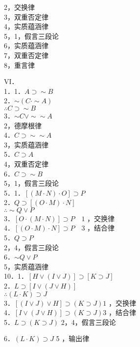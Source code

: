 2，交换律\\
3，双重否定律\\
4，实质蕴涵律\\
5，1，假言三段论\\
6，实质蕴涵律\\
7，双重否定律\\
8，重言律

VI．\\
1．1．$A \supset \sim B$\\
2．$\sim(C \cdot \sim A)$\\
$\therefore C \supset \sim B$\\
3．$\sim C \vee \sim \sim A$\\
2，德摩根律\\
4．$C \supset \sim \sim A$\\
3，实质蕴涵律\\
5．$C \supset A$\\
4，双重否定律\\
6．$C \supset \sim B$\\
5，1，假言三段论\\
5．1．$[(M \cdot N) \cdot O] \supset P$\\
2．$Q \supset[(O \cdot M) \cdot N]$\\
$\therefore \sim Q \vee P$\\
3．$[O \cdot(M \cdot N)] \supset P \quad 1$ ，交换律\\
4．$[(O \cdot M) \cdot N] \supset P \quad 3$ ，结合律\\
5．$Q \supset P$\\
2，4，假言三段论\\
6．$\sim Q \vee P$\\
5，实质蕴涵律\\
10．1．$[H \vee(I \vee J)] \supset[K \supset J]$\\
2．$L \supset[I \vee(J \vee H)]$\\
$\therefore(L \cdot K) \supset J$\\
3．$[(I \vee J) \vee H] \supset(K \supset J) 1$ ，交换律\\
4．$[I \vee(J \vee H)] \supset(K \supset J) 3$ ，结合律\\
5．$L \supset(K \supset J)$ 2，4，假言三段论

6．$(L \cdot K) \supset J$ 5 ，输出律

